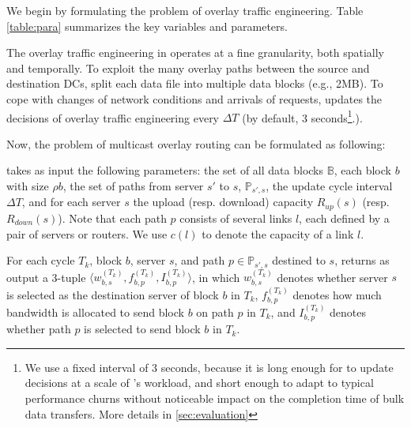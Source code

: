We begin by formulating the problem of overlay traffic engineering.
Table \ref{table:para} summarizes the key variables and parameters.

The overlay traffic engineering in \name operates at a
fine granularity, both spatially and temporally. To exploit the many
overlay paths between the source and destination DCs, \name split
each data file into multiple data blocks (e.g., 2MB).
To cope with changes of network conditions and arrivals of requests,
\name updates the decisions of overlay traffic engineering every
$\Delta T$ (by default, 3 seconds\footnote{We use a fixed interval of
3 seconds, because it is long enough for \name to update decisions at
a scale of \company's workload, and short enough to adapt to typical
performance churns without noticeable impact on the completion time
of bulk data transfers.
More details in \Section\ref{sec:evaluation}}.).


Now, the problem of multicast overlay routing can be formulated as
following:

 \name takes as input the following parameters:
the set of all data blocks $\mathbb{B}$, each block $b$ with size
$\rho{b}$, the set of paths from server $s'$ to $s$,
$\mathbb{P}_{s',s}$, the update cycle interval $\Delta T$, and for
each server $s$ the upload (resp. download) capacity $R_{up}(s)$
(resp. $R_{down}(s)$). Note that each path $p$ consists of several
links $l$, each defined by a pair of servers or routers. We use
$c(l)$ to denote the capacity of a link $l$.

 For each cycle $T_{k}$, block $b$, server $s$, and
path $p\in\mathbb{P}_{s',s}$ destined to $s$, \name returns as output
a 3-tuple $\langle w^{(T_k)}_{b,s}, f_{b,p}^{(T_k)}, I^{(T_k)}_{b,p}
\rangle$, in which $w^{(T_k)}_{b,s}$ denotes whether server $s$ is
selected as the destination server of block $b$ in $T_k$,
$f_{b,p}^{(T_k)}$ denotes how much bandwidth is allocated to send
block $b$ on path $p$ in $T_k$, and $I^{(T_k)}_{b,p}$ denotes whether
path $p$ is selected to send block $b$ in $T_k$.

